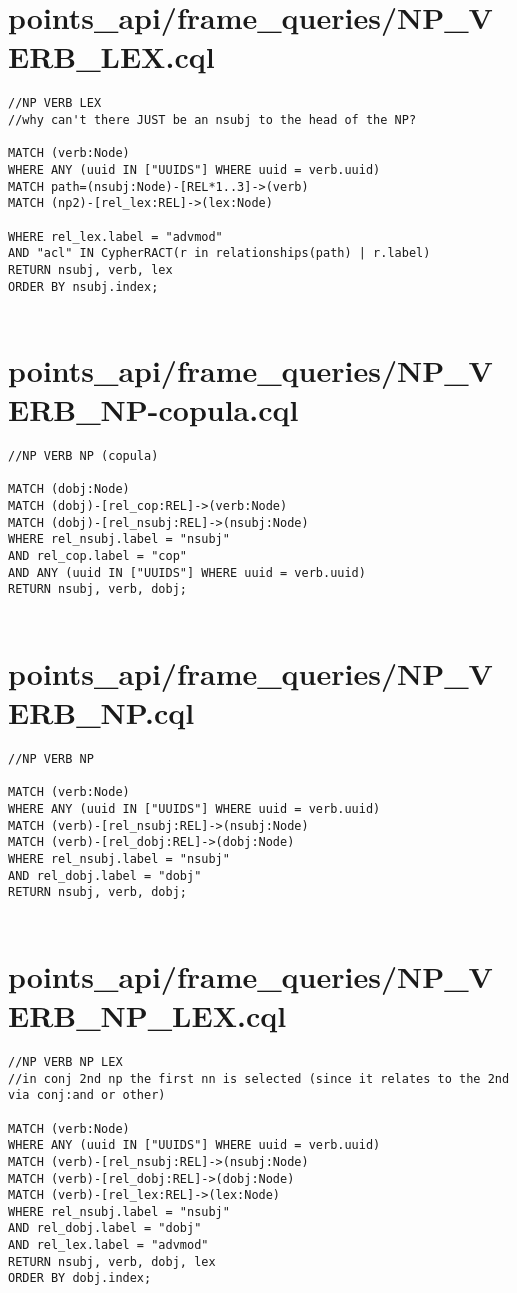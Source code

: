 \documentclass{article}
\begin{document}
\section*{points\_api/frame\_queries/NP\_VERB\_LEX.cql}
\begin{verbatim}
//NP VERB LEX
//why can't there JUST be an nsubj to the head of the NP?

MATCH (verb:Node)
WHERE ANY (uuid IN ["UUIDS"] WHERE uuid = verb.uuid)
MATCH path=(nsubj:Node)-[REL*1..3]->(verb)
MATCH (np2)-[rel_lex:REL]->(lex:Node)

WHERE rel_lex.label = "advmod"
AND "acl" IN CypherRACT(r in relationships(path) | r.label)
RETURN nsubj, verb, lex
ORDER BY nsubj.index;


\end{verbatim}
\pagebreak

\section*{points\_api/frame\_queries/NP\_VERB\_NP-copula.cql}
\begin{verbatim}
//NP VERB NP (copula)

MATCH (dobj:Node)
MATCH (dobj)-[rel_cop:REL]->(verb:Node)
MATCH (dobj)-[rel_nsubj:REL]->(nsubj:Node)
WHERE rel_nsubj.label = "nsubj"
AND rel_cop.label = "cop"
AND ANY (uuid IN ["UUIDS"] WHERE uuid = verb.uuid)
RETURN nsubj, verb, dobj;


\end{verbatim}
\pagebreak

\section*{points\_api/frame\_queries/NP\_VERB\_NP.cql}
\begin{verbatim}
//NP VERB NP

MATCH (verb:Node)
WHERE ANY (uuid IN ["UUIDS"] WHERE uuid = verb.uuid)
MATCH (verb)-[rel_nsubj:REL]->(nsubj:Node)
MATCH (verb)-[rel_dobj:REL]->(dobj:Node)
WHERE rel_nsubj.label = "nsubj"
AND rel_dobj.label = "dobj"
RETURN nsubj, verb, dobj;


\end{verbatim}
\pagebreak

\section*{points\_api/frame\_queries/NP\_VERB\_NP\_LEX.cql}
\begin{verbatim}
//NP VERB NP LEX
//in conj 2nd np the first nn is selected (since it relates to the 2nd via conj:and or other)

MATCH (verb:Node)
WHERE ANY (uuid IN ["UUIDS"] WHERE uuid = verb.uuid)
MATCH (verb)-[rel_nsubj:REL]->(nsubj:Node)
MATCH (verb)-[rel_dobj:REL]->(dobj:Node)
MATCH (verb)-[rel_lex:REL]->(lex:Node)
WHERE rel_nsubj.label = "nsubj"
AND rel_dobj.label = "dobj"
AND rel_lex.label = "advmod"
RETURN nsubj, verb, dobj, lex
ORDER BY dobj.index;


\end{verbatim}
\pagebreak
\end{document}
